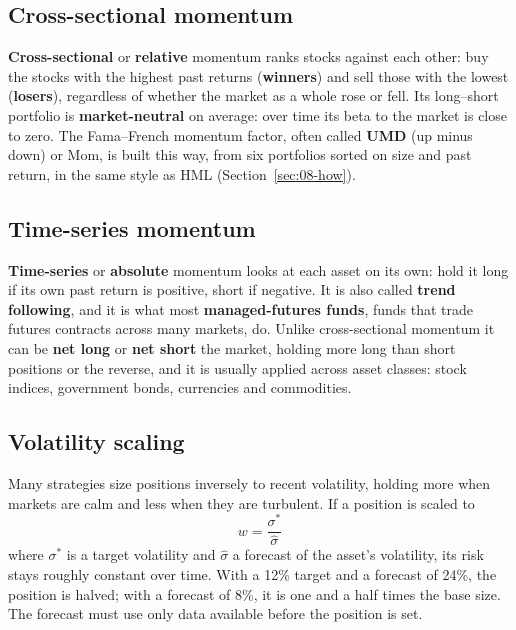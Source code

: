 \subsection{Cross-sectional momentum}

\textbf{Cross-sectional} or \textbf{relative} momentum ranks stocks against each other: buy the stocks with the highest past returns (\textbf{winners}) and sell those with the lowest (\textbf{losers}), regardless of whether the market as a whole rose or fell. Its long--short portfolio is \textbf{market-neutral} on average: over time its beta to the market is close to zero. The Fama--French momentum factor, often called \textbf{UMD} (up minus down) or Mom, is built this way, from six portfolios sorted on size and past return, in the same style as HML (Section~\ref{sec:08-how}).

\subsection{Time-series momentum}

\textbf{Time-series} or \textbf{absolute} momentum looks at each asset on its own: hold it long if its own past return is positive, short if negative. It is also called \textbf{trend following}, and it is what most \textbf{managed-futures funds}, funds that trade futures contracts across many markets, do. Unlike cross-sectional momentum it can be \textbf{net long} or \textbf{net short} the market, holding more long than short positions or the reverse, and it is usually applied across asset classes: stock indices, government bonds, currencies and commodities.

\subsection{Volatility scaling}

Many strategies size positions inversely to recent volatility, holding more when markets are calm and less when they are turbulent. If a position is scaled to
\begin{equation}
  w = \frac{\sigma^*}{\hat\sigma}
  \label{eq:09-volscale}
\end{equation}
where $\sigma^*$ is a target volatility and $\hat\sigma$ a forecast of the asset's volatility, its risk stays roughly constant over time. With a 12\% target and a forecast of 24\%, the position is halved; with a forecast of 8\%, it is one and a half times the base size. The forecast must use only data available before the position is set.

